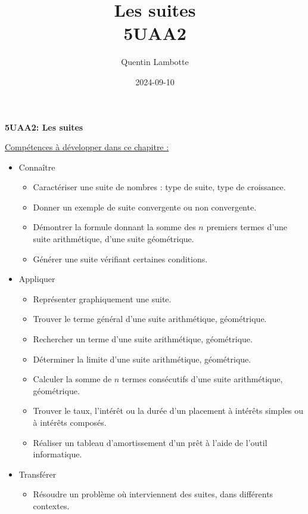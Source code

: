 \documentclass[a4paper,12pt]{report}
\author{Quentin Lambotte}
\date{2024-09-10}
\title{Les suites\\\medskip
\large 5UAA2}
\begin{document}
\begin{titlepage}
\begin{center}
\vspace{2cm}
\Huge
\textbf{5UAA2: Les suites}
\vspace{2cm}

\begin{center}

\end{center}
\end{center}

\vspace{1cm}
\singlespacing
\small
\uline{Compétences à développer dans ce chapitre :}
\begin{itemize}
\item Connaître
\begin{itemize}
\item Caractériser une suite de nombres : type de suite, type de croissance.
\item Donner un exemple de suite convergente ou non convergente.
\item Démontrer la formule donnant la somme des \(n\) premiers termes d’une suite
arithmétique, d’une suite géométrique.
\item Générer une suite vérifiant certaines conditions.
\end{itemize}
\item Appliquer
\begin{itemize}
\item Représenter graphiquement une suite.
\item Trouver le terme général d'une suite arithmétique, géométrique.
\item Rechercher un terme d'une suite arithmétique, géométrique.
\item Déterminer la limite d'une suite arithmétique, géométrique.
\item Calculer la somme de \(n\) termes consécutifs d’une suite arithmétique,
géométrique.
\item Trouver le taux, l'intérêt ou la durée d'un placement à intérêts simples ou
à intérêts composés.
\item Réaliser un tableau d’amortissement d’un prêt à l’aide de l’outil
informatique.
\end{itemize}
\item Transférer
\begin{itemize}
\item Résoudre un problème où interviennent des suites, dans différents contextes.
\end{itemize}
\end{itemize}
\end{titlepage}
\onehalfspacing
\end{document}
